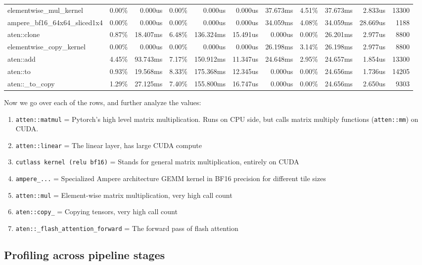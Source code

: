 \begin{table}[htbp]
{\begin{tabular}{lrrrrrrrrrr}
elementwise\_mul\_kernel & 0.00\% & 0.000us & 0.00\% & 0.000us & 0.000us & 37.673ms & 4.51\% & 37.673ms & 2.833us & 13300 \\
ampere\_bf16\_64x64\_sliced1x4 & 0.00\% & 0.000us & 0.00\% & 0.000us & 0.000us & 34.059ms & 4.08\% & 34.059ms & 28.669us & 1188 \\
aten::clone & 0.87\% & 18.407ms & 6.48\% & 136.324ms & 15.491us & 0.000us & 0.00\% & 26.201ms & 2.977us & 8800 \\
elementwise\_copy\_kernel & 0.00\% & 0.000us & 0.00\% & 0.000us & 0.000us & 26.198ms & 3.14\% & 26.198ms & 2.977us & 8800 \\
aten::add & 4.45\% & 93.743ms & 7.17\% & 150.912ms & 11.347us & 24.648ms & 2.95\% & 24.657ms & 1.854us & 13300 \\
aten::to & 0.93\% & 19.568ms & 8.33\% & 175.368ms & 12.345us & 0.000us & 0.00\% & 24.656ms & 1.736us & 14205 \\
aten::\_to\_copy & 1.29\% & 27.125ms & 7.40\% & 155.800ms & 16.747us & 0.000us & 0.00\% & 24.656ms & 2.650us & 9303 \\
\bottomrule
\end{tabular}%
}
\end{table}


Now we go over each of the rows, and further analyze the values:
\begin{enumerate}
    \item \texttt{atten::matmul} = Pytorch's high level matrix multiplication. Runs on CPU side, but calls matrix multiply functions (\texttt{atten::mm}) on CUDA.
    \item \texttt{atten::linear} = The linear layer, has large CUDA compute
    \item \texttt{cutlass kernel (relu bf16)} = Stands for general matrix multiplication, entirely on CUDA
    \item \texttt{ampere\_...} = Specialized Ampere architecture GEMM kernel in BF16 precision for different tile sizes
    \item \texttt{atten::mul} = Element-wise matrix multiplication, very high call count
    \item \texttt{aten::copy\_} = Copying tensors, very high call count
    \item \texttt{aten::\_flash\_attention\_forward} = The forward pass of flash attention 
\end{enumerate}

\subsection{Profiling across pipeline stages}

